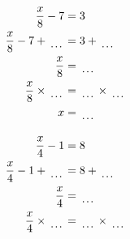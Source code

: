 \documentclass[12pt]{article}
\newcounter{minipagecount}
\begin{document}
\begin{multicols}{2}
\begin{minipage}[t]{0.45\textwidth}
    \raggedright %
    \begin{align*} %
        \frac{x}{8} - 7 &= 3\\
        \frac{x}{8} - 7 + \dotuline{\hspace{5mm}} &= 3 + \dotuline{\hspace{5mm}}\\
        \frac{x}{8} &= \dotuline{\hspace{5mm}}\\
        \frac{x}{8} \times\dotuline{\hspace{5mm}} &= \dotuline{\hspace{5mm}} \times\dotuline{\hspace{5mm}}\\
        x &= \dotuline{\hspace{5mm}}\\
    \end{align*}
\end{minipage} %
\noindent{(\theminipagecount)}\hspace{0.1mm} %
\begin{minipage}[t]{0.45\textwidth} %
    \vspace{-26pt}  %
    \raggedright %
    \begin{align*} %
        \frac{x}{4} - 1 &= 8\\
        \frac{x}{4} - 1 + \dotuline{\hspace{5mm}} &= 8 + \dotuline{\hspace{5mm}}\\
        \frac{x}{4} &= \dotuline{\hspace{5mm}}\\
        \frac{x}{4} \times\dotuline{\hspace{5mm}} &= \dotuline{\hspace{5mm}} \times\dotuline{\hspace{5mm}}\\

\end{align*}
\end{minipage}
\end{multicols}
\end{document}
